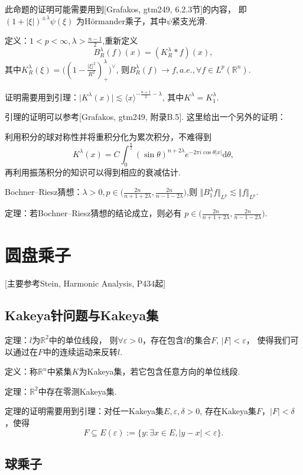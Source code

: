 此命题的证明可能需要用到[Grafakos, gtm249, 6.2.3节]的内容，
即$(1+\left\vert \xi  \right\vert )^{\pm \lambda}\psi(\xi)$
为H\"{o}rmander乘子，其中$\psi$紧支光滑.

定义：$1<p<\infty,\lambda> \frac{n-1}2$,重新定义
$$ B_R^\lambda (f)(x)=(K_R^\lambda *f)(x),$$
其中$K_R^\lambda(\xi)= \big((1-\frac{|\xi|^2}{R^2})_+^\lambda\big)^\vee $,
则$B^\lambda_R(f)\to f, a.e.,\forall f\in L^p(\mathbb{R}^n)$.

证明需要用到引理：$\big|K^\lambda(x)\big|\lesssim \langle x \rangle ^{-\frac{n+1}2-\lambda}$,
其中$K^\lambda=K^\lambda_1$.

引理的证明可以参考[Grafakos, gtm249, 附录B.5]. 这里给出一个另外的证明：

利用积分的球对称性并将重积分化为累次积分，不难得到
$$K^\lambda(x)=C\int _{0}^{\frac{\pi}{2}} (\sin \theta)^{n+2\lambda} 
e^{-2\pi i\cos \theta \left\vert x \right\vert }\mathrm{d}\theta,$$
再利用振荡积分的知识可以得到相应的衰减估计.

Bochner--Riesz猜想：$\lambda>0,
p\in \big(\frac{2n}{n+1+2\lambda},\frac{2n}{n-1-2\lambda}\big)$,则
$\Vert B^\lambda_1 f\Vert _{L^p}\lesssim \Vert f\Vert _{L^p}.$

定理：若Bochner--Riesz猜想的结论成立，则必有
$p\in \big(\frac{2n}{n+1+2\lambda},\frac{2n}{n-1-2\lambda}\big)$.

\section{圆盘乘子}
[主要参考Stein, Harmonic Analysis, P434起]
\subsection{Kakeya针问题与Kakeya集}
定理：$l$为$\mathbb{R}^2$中的单位线段，
则$\forall \varepsilon>0$，存在包含$l$的集合$F$, $|F|<\varepsilon$，
使得我们可以通过在$F$中的连续运动来反转$l$.

定义：称$\mathbb{R}^n$中紧集$K$为Kakeya集，若它包含任意方向的单位线段.

定理：$\mathbb{R}^2$中存在零测Kakeya集.

定理的证明需要用到引理：对任一Kakeya集$E,\varepsilon,\delta>0$,
存在Kakeya集$F$，$|F|<\delta$，使得
$$F \subseteq E(\varepsilon):=\{   y:\exists x\in E,|y-x| <\varepsilon \}.$$

\subsection{球乘子}

